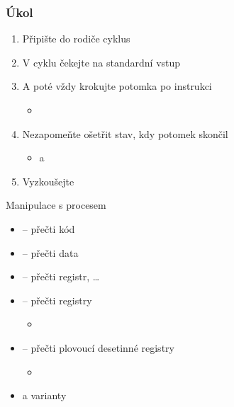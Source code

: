 \begin{frame}
  \frametitle{Úkol}

  \begin{enumerate}
    \item Připište do rodiče cyklus

    \item V cyklu čekejte na standardní vstup
    \item A poté vždy krokujte potomka po instrukci
    \begin{itemize}
      \item {}
    \end{itemize}

    \item Nezapomeňte ošetřit stav, kdy potomek skončil
    \begin{itemize}
      \item {} a 
    \end{itemize}
    \item Vyzkoušejte
  \end{enumerate}

\end{frame}

\begin{frame}{}{Manipulace s procesem}

  \heading{}
  \begin{itemize}
    \item {} -- přečti kód
    \item {} -- přečti data

    \pause

    \item {} -- přečti registr, \dots

    \pause

    \item {} -- přečti registry
    \begin{itemize}
      \item {}
    \end{itemize}

    \pause

    \item {} -- přečti plovoucí desetinné registry
    \begin{itemize}
      \item {}
    \end{itemize}

    \pause

    \item {} a  varianty
  \end{itemize}

\end{frame}

